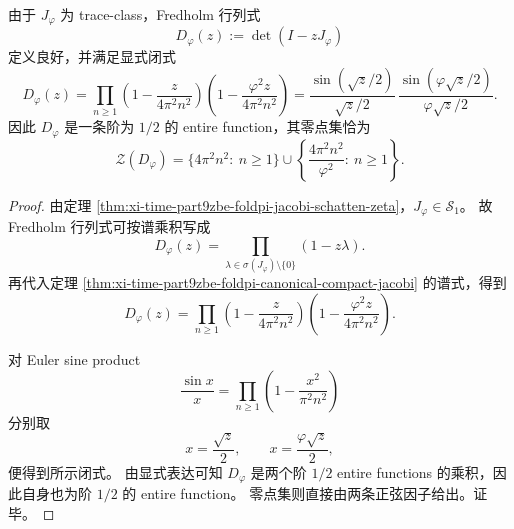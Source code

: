 \begin{theorem}\label{thm:xi-time-part9zbe-foldpi-fredholm-double-sine}
由于 \(J_\varphi\) 为 trace-class，Fredholm 行列式
\[
D_\varphi(z):=\det(I-zJ_\varphi)
\]
定义良好，并满足显式闭式
\[
D_\varphi(z)
=
\prod_{n\ge 1}
\left(1-\frac{z}{4\pi^2n^2}\right)
\left(1-\frac{\varphi^2 z}{4\pi^2n^2}\right)
=
\frac{\sin(\sqrt z/2)}{\sqrt z/2}\,
\frac{\sin(\varphi\sqrt z/2)}{\varphi\sqrt z/2}.
\]
因此 \(D_\varphi\) 是一条阶为 \(1/2\) 的 entire function，其零点集恰为
\[
\mathcal Z(D_\varphi)
=
\{4\pi^2n^2:\ n\ge 1\}
\cup
\left\{\frac{4\pi^2n^2}{\varphi^2}:\ n\ge 1\right\}.
\]
\end{theorem}
\begin{proof}
由定理 \ref{thm:xi-time-part9zbe-foldpi-jacobi-schatten-zeta}，\(J_\varphi\in\mathcal S_1\)。
故 Fredholm 行列式可按谱乘积写成
\[
D_\varphi(z)=\prod_{\lambda\in \sigma(J_\varphi)\setminus\{0\}}(1-z\lambda).
\]
再代入定理 \ref{thm:xi-time-part9zbe-foldpi-canonical-compact-jacobi} 的谱式，得到
\[
D_\varphi(z)
=
\prod_{n\ge 1}
\left(1-\frac{z}{4\pi^2n^2}\right)
\left(1-\frac{\varphi^2 z}{4\pi^2n^2}\right).
\]

对 Euler sine product
\[
\frac{\sin x}{x}
=
\prod_{n\ge 1}\left(1-\frac{x^2}{\pi^2n^2}\right)
\]
分别取
\[
x=\frac{\sqrt z}{2},
\qquad
x=\frac{\varphi\sqrt z}{2},
\]
便得到所示闭式。
由显式表达可知 \(D_\varphi\) 是两个阶 \(1/2\) entire functions 的乘积，因此自身也为阶 \(1/2\) 的 entire function。
零点集则直接由两条正弦因子给出。证毕。
\end{proof}

